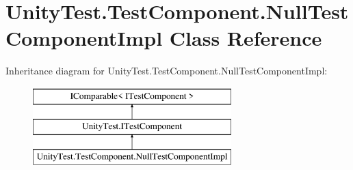 \hypertarget{class_unity_test_1_1_test_component_1_1_null_test_component_impl}{}\section{Unity\+Test.\+Test\+Component.\+Null\+Test\+Component\+Impl Class Reference}
\label{class_unity_test_1_1_test_component_1_1_null_test_component_impl}
Inheritance diagram for Unity\+Test.\+Test\+Component.\+Null\+Test\+Component\+Impl\+:\begin{figure}[H]
\begin{center}
\leavevmode
\includegraphics[height=3.000000cm]{class_unity_test_1_1_test_component_1_1_null_test_component_impl}
\end{center}
\end{figure}
